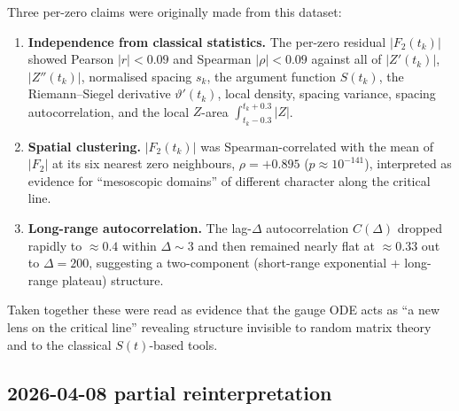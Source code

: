 \documentclass[11pt, a4paper]{article}
\theoremstyle{definition}
\theoremstyle{plain}
\begin{document}
Three per-zero claims were originally made from this dataset:
\begin{enumerate}
  \item[(O1)] \textbf{Independence from classical statistics.} The
        per-zero residual $|F_2(t_k)|$ showed Pearson
        $|r|<0.09$ and Spearman $|\rho|<0.09$ against all of
        $|Z'(t_k)|$, $|Z''(t_k)|$, normalised spacing $s_k$, the
        argument function $S(t_k)$, the Riemann--Siegel derivative
        $\vartheta'(t_k)$, local density, spacing variance,
        spacing autocorrelation, and the local $Z$-area
        $\int_{t_k-0.3}^{t_k+0.3}|Z|$.
  \item[(O2)] \textbf{Spatial clustering.} $|F_2(t_k)|$ was
        Spearman-correlated with the mean of $|F_2|$ at its six
        nearest zero neighbours, $\rho=+0.895$
        ($p\approx 10^{-141}$), interpreted as evidence for
        ``mesoscopic domains'' of different character along the
        critical line.
  \item[(O3)] \textbf{Long-range autocorrelation.} The lag-$\Delta$
        autocorrelation $C(\Delta)$ dropped rapidly to $\approx 0.4$
        within $\Delta\sim 3$ and then remained nearly flat at
        $\approx 0.33$ out to $\Delta=200$, suggesting a
        two-component (short-range exponential + long-range
        plateau) structure.
\end{enumerate}

Taken together these were read as evidence that the gauge ODE acts
as ``a new lens on the critical line'' revealing structure
invisible to random matrix theory and to the classical
$S(t)$-based tools.

\subsection{2026-04-08 partial reinterpretation}
\label{sec:f2_residual_reinterp}
\end{document}
